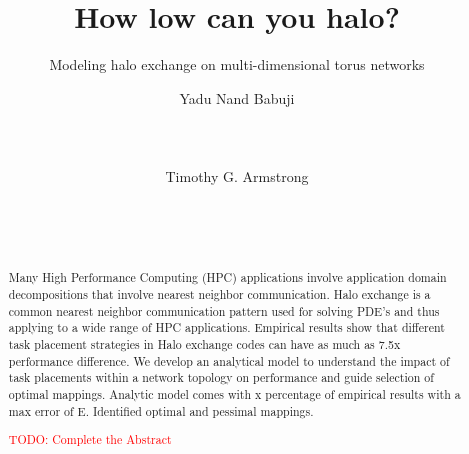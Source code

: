 \documentclass{acm_proc_article-sp}
\begin{document}
\setlength{\pdfpageheight}{\paperheight}
\setlength{\pdfpagewidth}{\paperwidth}


\newcommand{\timnote}[1]{ {\textcolor{maroon} { Tim: #1 }}}
\newcommand{\todo}[1]{ {\textcolor{red} { TODO: #1 }}}

\title{How low can you halo?}
\subtitle{Modeling halo exchange on multi-dimensional torus networks}


\author{
\alignauthor
Yadu Nand Babuji\\
       \\
       \\
       \\
\alignauthor
Timothy G. Armstrong\\
       \\
       \\
       \\
}
\maketitle

\begin{abstract}
Many High Performance Computing (HPC) applications involve application domain decompositions that involve nearest neighbor communication.
Halo exchange is a common nearest neighbor communication pattern used for solving PDE's and thus applying to a wide range of HPC applications.
Empirical results show that different task placement strategies in Halo exchange codes can have as much as 7.5x performance difference.
We develop an analytical model to understand the impact of task placements within a network topology on performance and guide selection of
optimal mappings.
Analytic model comes with x percentage of empirical results with a max error of E.
Identified optimal and pessimal mappings.

\todo{Complete the Abstract}

\end{abstract}
\end{document}
